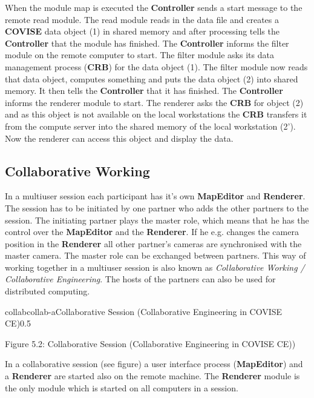 When the module map is executed the {\bf Controller} sends a start message to 
the remote read module. The read module reads in the data file and creates a 
{\bf COVISE} data object (1) in shared memory and after processing tells the 
{\bf Controller}  that the module  has finished. The {\bf Controller} informs the filter module on the 
remote computer to start. The filter module asks its data management 
process ({\bf CRB}) for the data object (1). The filter module now reads that data object, computes 
something and puts the data object (2) into shared memory. It then tells the 
{\bf Controller} that it has finished. The {\bf Controller} informs the renderer module to 
start. The renderer asks the {\bf CRB} for object (2) and as this object is not 
available on the local workstations the {\bf CRB} transfers it from the compute 
server into the shared memory of the local workstation (2'). Now the renderer can 
access this object and display the data. 

\subsection{Collaborative Working}
\label{collaborative}

In a multiuser session each participant has it's own {\bf MapEditor} and {\bf Renderer}. 
The session has to be initiated by one partner who adds the other partners to 
the session. The initiating partner plays the 
master role, which means that he has the control over the {\bf MapEditor} and the 
{\bf Renderer}. If he e.g. changes the camera position in the {\bf Renderer} all other 
partner's cameras are synchronised with the master camera. The master role 
can be exchanged between partners. This way of working together in a 
multiuser session is also known as {\it Collaborative Working / Collaborative Engineering}.
The hosts of the partners can also be used for distributed computing.


\begin{covimg}{collab}{collab-a}{Collaborative Session (Collaborative
Engineering in COVISE CE)}{0.5}\end{covimg}
\begin{htmlonly}
Figure 5.2: Collaborative Session (Collaborative Engineering in COVISE CE))
\vspace{1cm}
\end{htmlonly}
	 
In a collaborative session (see figure) a user interface process ({\bf MapEditor}) 
and a {\bf Renderer} are started also on the remote machine. The {\bf Renderer} 
module is the only module which is started on all computers in a session.


